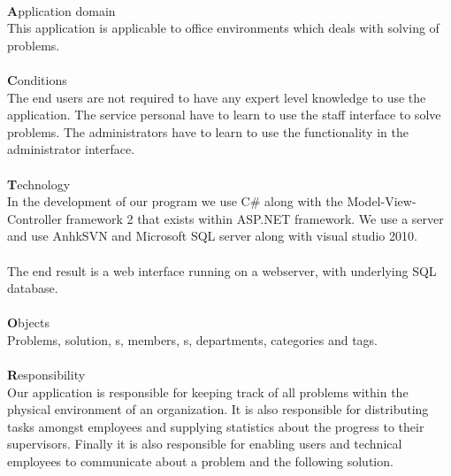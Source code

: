 \ \\
{\Large \textbf{A}}pplication domain \\
This application is applicable to office environments which deals with solving of problems.\\
\ \\
{\Large \textbf{C}}onditions \\ 
The end users are not required to have any expert level knowledge to use the application. The service personal have to learn to use the staff interface to solve problems. The administrators have to learn to use the functionality in the administrator interface.   \\
\ \\
{\Large \textbf{T}}echnology \\
In the development of our program we use C\# along with the Model-View-Controller framework 2 that exists within ASP.NET framework. We use a server and use AnhkSVN and Microsoft SQL server along with visual studio 2010.\\
\\
The end result is a web interface running on a webserver, with underlying SQL database.\\
\ \\
{\Large \textbf{O}}bjects \\
Problems, solution, \aclient[]s, \astaff[] members, \admin{}s, departments, categories and tags. \\
\ \\
{\Large \textbf{R}}esponsibility \\
Our application is responsible for keeping track of all problems within the physical environment of an organization. It is also responsible for distributing tasks amongst employees and supplying statistics about the progress to their supervisors. Finally it is also responsible for enabling users and technical employees to communicate about a problem and the following solution.
\ \\ 


